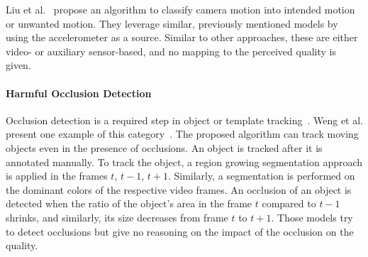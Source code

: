 Liu et al.~\cite{Liu2014} propose an algorithm to classify camera motion into intended motion or unwanted motion.
They leverage similar, previously mentioned models by using the accelerometer as a source.
Similar to other approaches, these are either video- or auxiliary sensor-based, and no mapping to the perceived quality is given.
\paragraph{Harmful Occlusion Detection}
Occlusion detection is a required step in object or template tracking~\cite{Koller1994,Nguyen2001,Saravanakumar2012,Weng2006}.
Weng et al. present one example of this category~\cite{Weng2006}.
The proposed algorithm can track moving objects even in the presence of occlusions.
An object is tracked after it is annotated manually.
To track the object, a region growing segmentation approach is applied in the frames $t$, $t-1$, $t + 1$.
Similarly, a segmentation is performed on the dominant colors of the respective video frames.
An occlusion of an object is detected when the ratio of the object's area in the frame $t$ compared to $t-1$ shrinks, and similarly, its size decreases from frame $t$ to $t+1$.
Those models try to detect occlusions but give no reasoning on the impact of the occlusion on the quality.

